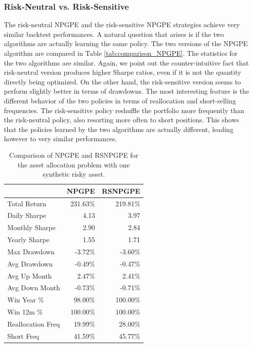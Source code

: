 \subsubsection{Risk-Neutral vs. Risk-Sensitive}
The risk-neutral NPGPE and the risk-sensitive NPGPE strategies achieve very similar backtest performances. A natural question that arises is if the two algorithms are actually learning the same policy. The two versions of the NPGPE algorithm are compared in Table \ref{tab:comparison_NPGPE}. The statistics for the two algorithms are similar. Again, we point out the counter-intuitive fact that risk-neutral version produces higher Sharpe ratios, even if it is not the quantity directly being optimized. On the other hand, the risk-sensitive version seems to perform slightly better in terms of drawdowns. The most interesting feature is the different behavior of the two policies in terms of reallocation and short-selling frequencies. The risk-sensitive policy reshuffle the portfolio more frequently than the risk-neutral policy, also resorting more often to short positions. This shows that the policies learned by the two algorithms are actually different, leading however to very similar performances. 

\begin{table}[t!]
\centering
\begin{tabular}{@{}lrr@{}}
\toprule
                  & NPGPE   & RSNPGPE  \\ \midrule
Total Return      & 231.63\%  & 219.81\% \\
Daily Sharpe      & 4.13     & 3.97     \\
Monthly Sharpe    & 2.90     & 2.84     \\
Yearly Sharpe     & 1.55     & 1.71     \\
Max Drawdown      & -3.72\% & -3.60\%  \\
Avg Drawdown      & -0.49\%  & -0.47\%  \\
Avg Up Month      & 2.47\%   & 2.41\%   \\
Avg Down Month    & -0.73\%  & -0.71\%  \\
Win Year \%       & 98.00\%  & 100.00\% \\
Win 12m \%        & 100.00\%  & 100.00\% \\
Reallocation Freq & 19.99\%  & 28.00\%  \\
Short Freq        & 41.59\%  & 45.77\%  \\ \bottomrule
\end{tabular}
\caption{Comparison of NPGPE and RSNPGPE for the asset allocation problem with one synthetic risky asset.}
\label{tab:omparison_NPGPE}
\end{table}


